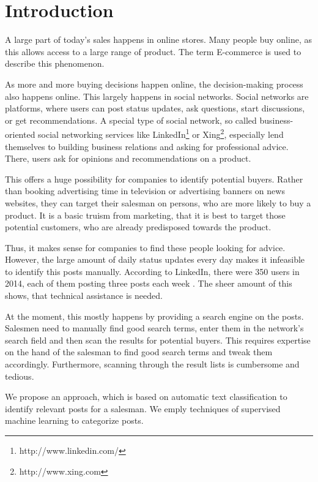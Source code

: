 
\section{Introduction}
\label{sec:introduction}

A large part of today's sales  happens in online stores.
Many people buy online, as this allows access to a large range of product.
The term E-commerce is used to describe this phenomenon.

As more and more buying decisions happen online, the decision-making process also happens online.
This largely happens in social networks.
Social networks are platforms, where users can post status updates, ask questions, start discussions,  or get recommendations.
A special type of social network, so called business-oriented social networking services like LinkedIn\footnote{http://www.linkedin.com/} or Xing\footnote{http://www.xing.com}, especially lend themselves to building business relations and asking for professional advice.
There, users ask for opinions and recommendations on a product.

This offers a huge possibility for companies to identify potential buyers.
Rather than booking advertising time in television or advertising banners on news websites, they can target their salesman on persons, who are more likely to buy a product.
It is a basic truism from marketing, that it is best to target those potential customers, who are already predisposed towards the product. 

Thus, it makes sense for companies to find these people looking for advice.
However, the large amount of daily status updates every day makes it infeasible to identify this posts manually.
According to LinkedIn, there were 350 users in 2014, each of them posting three posts each week .
The sheer amount of this shows, that technical assistance is needed.

At the moment, this mostly happens by providing a search engine on the posts.
Salesmen need to manually find good search terms, enter them in the network's search field and then scan the results for potential buyers.
This requires expertise on the hand of the salesman to find good search terms and tweak them accordingly.
Furthermore, scanning through the result lists is cumbersome and tedious.

We propose an approach, which is based on automatic text classification to identify relevant posts for a salesman.
We emply techniques of supervised machine learning to categorize  posts.

